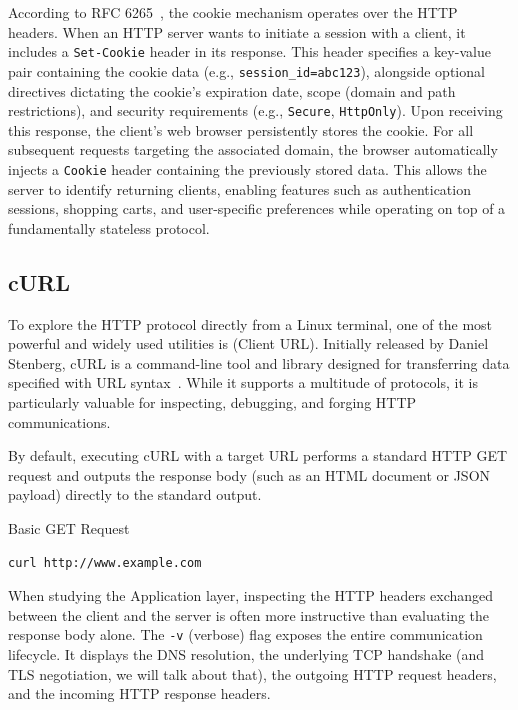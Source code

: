 According to RFC 6265~\cite{rfc6265}, the cookie mechanism operates over the HTTP headers. When an HTTP server wants to initiate a session with a client, it includes a \texttt{Set-Cookie} header in its response. This header specifies a key-value pair containing the cookie data (e.g., \texttt{session\_id=abc123}), alongside optional directives dictating the cookie's expiration date, scope (domain and path restrictions), and security requirements (e.g., \texttt{Secure}, \texttt{HttpOnly}). 
Upon receiving this response, the client's web browser persistently stores the cookie. For all subsequent requests targeting the associated domain, the browser automatically injects a \texttt{Cookie} header containing the previously stored data. This allows the server to identify returning clients, enabling features such as authentication sessions, shopping carts, and user-specific preferences while operating on top of a fundamentally stateless protocol.

\subsection{cURL}
To explore the HTTP protocol directly from a Linux terminal, one of the most powerful and widely used utilities is  (Client URL). Initially released by Daniel Stenberg, cURL is a command-line tool and library designed for transferring data specified with URL syntax~\cite{curl_docs}. While it supports a multitude of protocols, it is particularly valuable for inspecting, debugging, and forging HTTP communications.

By default, executing cURL with a target URL performs a standard HTTP GET request and outputs the response body (such as an HTML document or JSON payload) directly to the standard output.

\begin{example}{Basic GET Request}
\begin{verbatim}
curl http://www.example.com
\end{verbatim}
\end{example}

When studying the Application layer, inspecting the HTTP headers exchanged between the client and the server is often more instructive than evaluating the response body alone. The \texttt{-v} (verbose) flag exposes the entire communication lifecycle. It displays the DNS resolution, the underlying TCP handshake (and TLS negotiation, we will talk about that), the outgoing HTTP request headers, and the incoming HTTP response headers.

